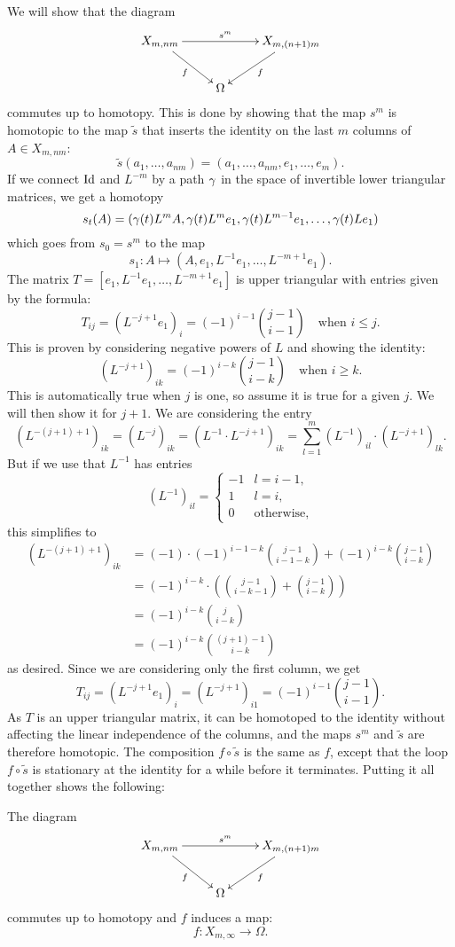We will show that the diagram
\[ \xymatrix{ X_{m,nm} \ar[rr]^{s^m}\ar[dr]_f & & X_{m,(n+1)m}
  \ar[dl]^f \\
  & \Omega & } \]
commutes up to homotopy. This is done by showing that the map $s^m$ is
homotopic to the map $\widetilde s$ that inserts the identity on the
last $m$ columns of $A \in X_{m,nm}$:
\[ \widetilde s (a_1,\dots,a_{nm}) =
(a_1,\dots,a_{nm},e_1,\dots,e_m). \]
If we connect $\operatorname{Id}$ and $L^{-m}$ by a path $\gamma$ in the space of
invertible lower triangular matrices, we get a homotopy
\[ s_t(A) = (\gamma(t)L^mA,
\gamma(t)L^me_1,\gamma(t)L^{m-1}e_1,\dots,\gamma(t)Le_1) \]
which goes from $s_0 = s^m$ to the map
\[ s_1 : A \mapsto (A,e_1,L^{-1}e_1,\dots,L^{-m+1}e_1). \]
The matrix $T = [e_1,L^{-1}e_1,\dots,L^{-m+1}e_1]$ is upper
triangular with entries given by the formula:
\[ T_{ij} = (L^{-j+1}e_1)_i = (-1)^{i-1}\binom{j-1}{i-1} \quad
\text{when } i \leq j. \]
This is proven by considering negative powers of $L$ and showing the
identity:
\[ (L^{-j+1})_{ik} = (-1)^{i-k}\binom{j-1}{i-k} \quad \text{when } i
\geq k. \] 
This is automatically true when $j$ is one, so assume it is true for
a given $j$. We will then show it for $j+1$. We are considering the
entry
\[ (L^{-(j+1)+1})_{ik} = (L^{-j})_{ik} = (L^{-1}\cdot L^{-j+1})_{ik} =
\sum_{l=1}^m (L^{-1})_{il} \cdot (L^{-j+1})_{lk}. \]
But if we use that $L^{-1}$ has entries
\[ (L^{-1})_{il} =
\begin{cases}
  -1 & l = i-1, \\
  1 & l = i,  \\
  0 & \text{otherwise},
\end{cases} \]
this simplifies to
\begin{align*}
  (L^{-(j+1)+1})_{ik} &= (-1)\cdot(-1)^{i-1-k}\binom{j-1}{i-1-k}
                        + (-1)^{i-k}\binom{j-1}{i-k} \\
                      &= (-1)^{i-k}\cdot \left( \binom{j-1}{i-k-1} +
                        \binom{j-1}{i-k} \right)\\
                      &= (-1)^{i-k} \binom{j}{i-k} \\
                      &= (-1)^{i-k} \binom{(j+1)-1}{i-k}
\end{align*}
as desired. Since we are considering only the first column, we get
\[ T_{ij} = (L^{-j+1}e_1)_i = (L^{-j+1})_{i1} =
(-1)^{i-1}\binom{j-1}{i-1}. \]
As $T$ is an upper triangular matrix, it can be homotoped to
the identity without affecting the linear independence of the
columns, and the maps $s^m$ and $\widetilde s$ are therefore
homotopic. The composition
$f\circ \widetilde s$ is the same as $f$, except that the loop
$f\circ\widetilde s$ is stationary at the identity for a while before
it terminates. Putting it all together shows the following:
\begin{lemma}
  \label{lem:homotopycommute}
  The diagram
  \[ \xymatrix{ X_{m,nm} \ar[rr]^{s^m}\ar[dr]_{f} & & \ar[dl]^f
    X_{m,(n+1)m} \\
    & \Omega & } \]
  commutes up to homotopy and $f$ induces a map:
  \[ f : X_{m,\infty} \to \Omega. \]
\end{lemma}

